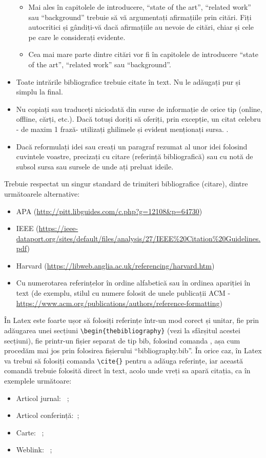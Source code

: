 \documentclass[12pt,a4paper]{report}
\begin{document}
\begin{itemize}
\begin{itemize}
		\item	Mai ales în capitolele de introducere, ``state of the art'', ``related work'' sau ``background'' trebuie să vă argumentați afirmațiile prin citări. Fiți autocritici și gândiți-vă dacă afirmațiile au nevoie de citări, chiar și cele pe care le considerați evidente.
		\item	Cea mai mare parte dintre citări vor fi în capitolele de introducere ``state of the art'', ``related work'' sau ``background''.
	\end{itemize}
	\item 	Toate intrările bibliografice trebuie citate în text. Nu le adăugați pur și simplu la final.
	\item 	Nu copiați sau traduceți niciodată din surse de informație de orice tip (online, offline, cărți, etc.). Dacă totuși doriți să oferiți, prin excepție, un citat celebru - de maxim 1 frază- utilizați ghilimele și evident menționați sursa. .
	\item 	Dacă reformulați idei sau creați un paragraf rezumat al unor idei folosind cuvintele voastre, precizați cu citare (referință bibliografică) sau cu notă de subsol sursa sau sursele de unde ați preluat ideile.
\end{itemize}

Trebuie respectat un singur standard de trimiteri bibliografice (citare), dintre următoarele alternative:
\begin{itemize}
	\item APA (\url{http://pitt.libguides.com/c.php?g=12108\&p=64730})
	\item IEEE (\url{https://ieee-dataport.org/sites/default/files/analysis/27/IEEE\%20Citation\%20Guidelines.pdf}) 
	\item Harvard (\url{https://libweb.anglia.ac.uk/referencing/harvard.htm})
	\item Cu numerotarea referințelor în ordine alfabetică sau în ordinea apariției în text (de exemplu, stilul cu numere folosit de unele publicații ACM - \url{https://www.acm.org/publications/authors/reference-formatting}) 
\end{itemize}

În Latex este foarte ușor să folosiți referințe într-un mod corect și unitar, fie prin adăugarea unei secțiuni
\verb!\begin{thebibliography}!
(vezi la sfârșitul acestei secțiuni), fie printr-un fișier separat de tip bib, folosind comanda
\verb!!,
așa cum procedăm mai jos prin folosirea fișierului ``bibliography.bib''. În orice caz, în Latex va trebui să folosiți comanda
\verb!\cite{}!
pentru a adăuga referințe, iar această comandă trebuie folosită direct în text, acolo unde vreți sa apară citația, ca în exemplele următoare:
\begin{itemize}
	\item Articol jurnal: ~\cite{article};
	\item Articol conferință:~\cite{proc};
	\item Carte: ~\cite{book};
	\item Weblink: ~\cite{silva};
\end{itemize}
\end{document}
